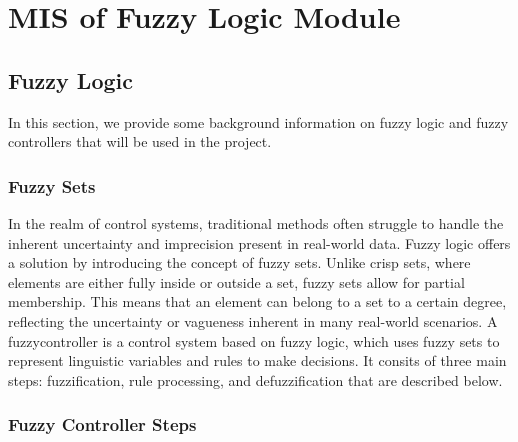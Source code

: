 \documentclass[12pt, titlepage]{article}
\begin{document}

\section{MIS of Fuzzy Logic Module} \label{mFuzzyLogic} 



\subsection{Fuzzy Logic}
In this section, we provide some background information on fuzzy logic and 
fuzzy controllers that will be used in the \progname{} project.

\subsubsection{Fuzzy Sets}
In the realm of control systems, traditional methods often struggle 
to handle the inherent uncertainty and imprecision present in real-world data. 
Fuzzy logic offers a solution by introducing the concept of fuzzy sets. 
Unlike crisp sets, where elements are either fully inside or outside a set, 
fuzzy sets allow for partial membership. This means that an element can 
belong to a set to a certain degree, reflecting the uncertainty or 
vagueness inherent in many real-world scenarios. A fuzzycontroller
is a control system based on fuzzy logic, which uses fuzzy sets to
represent linguistic variables and rules to make decisions.
It consits of three main steps: fuzzification, rule processing, and
defuzzification that are described below.

\subsubsection{Fuzzy Controller Steps}
\end{document}
